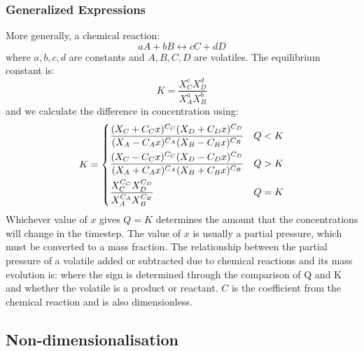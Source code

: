 \subsubsection{Generalized Expressions}
More generally, a chemical reaction: 
\begin{equation}
    aA + bB \leftrightarrow cC + dD
\end{equation}
where $a,b,c,d$ are constants and $A,B,C,D$ are volatiles.  The equilibrium constant is: 
\begin{equation}
    K = \frac{X_C^c X_D^d}{X_A^a X_B^b}
\end{equation}
and we calculate the difference in concentration using: 
\begin{equation}
K = 
     \begin{dcases}
        \frac{(X_C + C_Cx)^{C_C} (X_D + C_Dx)^{C_D}}{(X_A-C_Ax)^{C_A} (X_B-C_Bx)^{C_B}} & Q < K \\
        \frac{(X_C - C_Cx)^{C_C} (X_D - C_Dx)^{C_D}}{(X_A+C_Ax)^{C_A} (X_B+C_Bx)^{C_B}} & Q > K\\
        \frac{X_C^{C_C} X_D^{C_D}}{X_A^{C_A} X_B^{C_B}} & Q = K \\
    \end{dcases}
\end{equation}
Whichever value of $x$ gives $Q=K$ determines the amount that the concentrations will change in the timestep. The value of $x$ is usually a partial pressure, which must be converted to a mass fraction. The relationship between the partial pressure of a volatile added or subtracted due to chemical reactions and its mass evolution is: 
where the sign is determined through the comparison of Q and K and whether the volatile is a product or reactant. $C$ is the coefficient from the chemical reaction and is also dimensionless.  

\subsection{Non-dimensionalisation}
